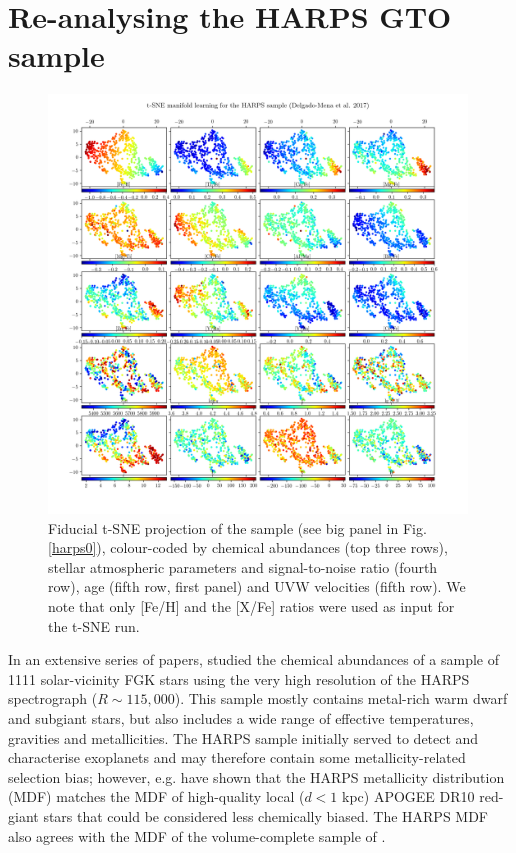 \documentclass{aa}  %
\begin{document}
\section{Re-analysing the HARPS GTO sample}\label{harps}

\begin{figure}\centering
 \includegraphics[width=0.99\textwidth]{im/HARPS_tsne_plots_withteffcut40_rand0.png}
\caption{Fiducial t-SNE projection of the \citet{DelgadoMena2017} sample (see big panel in Fig. \ref{harps0}), colour-coded by chemical abundances (top three rows), stellar atmospheric parameters and signal-to-noise ratio (fourth row), age (fifth row, first panel) and UVW velocities (fifth row). We note that only [Fe/H] and the [X/Fe] ratios were used as input for the t-SNE run.}
\label{harps1}
\end{figure}

In an extensive series of papers, \citet{Adibekyan2011, Adibekyan2012, DelgadoMena2014, DelgadoMena2015, BertrandeLis2015, Suarez-Andres2017, DelgadoMena2017, DelgadoMena2018} studied the chemical abundances of a sample of 1111 solar-vicinity FGK stars using the very high resolution of the HARPS spectrograph ($R\sim 115,000$). This sample mostly contains metal-rich warm dwarf and subgiant stars, but also includes a wide range of effective temperatures, gravities and metallicities. The HARPS sample initially served to detect and characterise exoplanets and may therefore contain some metallicity-related selection bias; however, e.g. \citet{Anders2014} have shown that the HARPS metallicity distribution (MDF) matches the MDF of high-quality local ($d<1$ kpc) APOGEE DR10 red-giant stars that could be considered less chemically biased. The HARPS MDF also agrees with the MDF of the volume-complete sample of \citet{Fuhrmann2011}.
\end{document}
